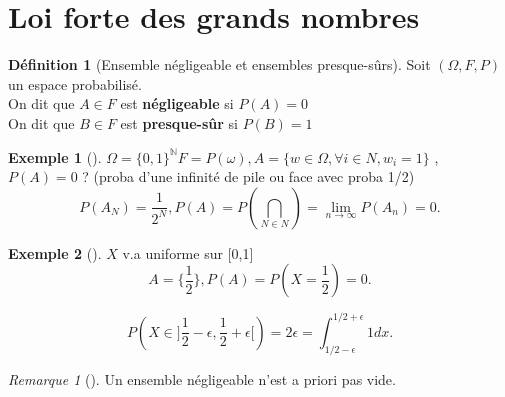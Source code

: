 \documentclass{article}
\theoremstyle{plain}%
\theoremstyle{definition}
\newtheorem{defn}{Définition}[section]
\newtheorem{exmp}{Exemple}[section]
\theoremstyle{remark}
\newtheorem*{rem}{Remarque}
\begin{document}
\section{Loi forte des grands nombres}
\begin{defn}[Ensemble négligeable et ensembles presque-sûrs]
    Soit $ (\Omega, F, P) $ un espace probabilisé. \\
    On dit que $ A \in F $ est \textbf{négligeable} si $ P(A) = 0 $ \\
    On dit que $ B \in F $ est \textbf{presque-sûr} si $ P(B) = 1 $ 
\end{defn}
\begin{exmp}[]
    $ \Omega = \{0,1\}^{\mathbb{N}}  F=P(\omega ), A=\{w \in \Omega ,\forall i \in N, w_i = 1\}$ , $ P(A) = 0 $ ? (proba d'une infinité de pile ou face avec proba 1/2)
    \[
        P(A_N) = \frac{1}{2^N}, P(A) = P(\bigcap_{N \in N}^{}) = \lim_{n \to \infty} P(A_n) = 0 
    .\]
\end{exmp}
\begin{exmp}[]
    $ X $ v.a uniforme sur [0,1]
    \[
        A=\{\frac{1}{2}\}, P(A) = P(X=\frac{1}{2}) = 0
    .\]
    
    \[
        P(X \in ]\frac{1}{2}-\epsilon , \frac{1}{2} + \epsilon [) = 2 \epsilon = \int_{1/2-\epsilon }^{1/2+\epsilon } 1dx
    .\]    
\end{exmp}
\begin{rem}[]
    Un ensemble négligeable n'est a priori pas vide.
\end{rem}
\end{document}

